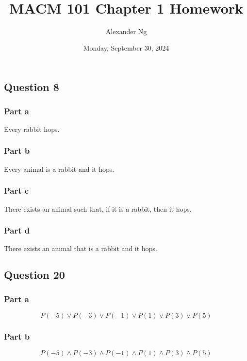 \documentclass[12pt]{article}
\begin{document}
\title{MACM 101 Chapter 1 Homework}
\author{Alexander Ng}
\date{Monday, September 30, 2024}

\maketitle

\subsection*{Question 8}

\subsubsection*{Part a}

Every rabbit hops.

\subsubsection*{Part b}

Every animal is a rabbit and it hops.

\subsubsection*{Part c}

There exists an animal such that, if it is a rabbit, then it hops.

\subsubsection*{Part d}

There exists an animal that is a rabbit and it hops.

\subsection*{Question 20}

\subsubsection*{Part a}

\[
P(-5) \lor P(-3) \lor P(-1) \lor P(1) \lor P(3) \lor P(5)
\]

\subsubsection*{Part b}

\[
P(-5) \land P(-3) \land P(-1) \land P(1) \land P(3) \land P(5)
\]
\end{document}
